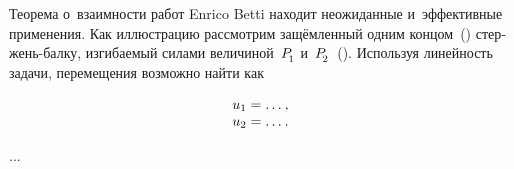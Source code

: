 \begin{otherlanguage}{russian}
\begin{wrapfigure}[10]{o}{.45\textwidth}
{\begin{minipage}[t]{.4\textwidth}
\vspace{-0.1em}\caption{}\label{fig:exampleofapplicationofreciprocalworktheorem}
\end{minipage}}
\end{wrapfigure}

Теорема о~взаимности работ Enrico Betti находит неожиданные и~эффективные применения. Как иллюстрацию рассмотрим защёмленный одним концом~() стержень-балку, изгибаемый силами величиной~$P_{\hspace{-0.25ex}\raisemath{-0.4ex}{1}}$ и~$P_{\hspace{-0.25ex}\raisemath{-0.4ex}{2}}$~(). Используя линейность задачи, перемещения возможно найти как

\nopagebreak\vspace{-0.1em}\begin{equation*}\begin{array}{c}
u_1 = \ldots \hspace{.1ex} ,
\\
u_2 = \ldots \hspace{.1ex} .
\end{array}\end{equation*}

...



\end{otherlanguage}



\label{para:equationsfordisplacement}

